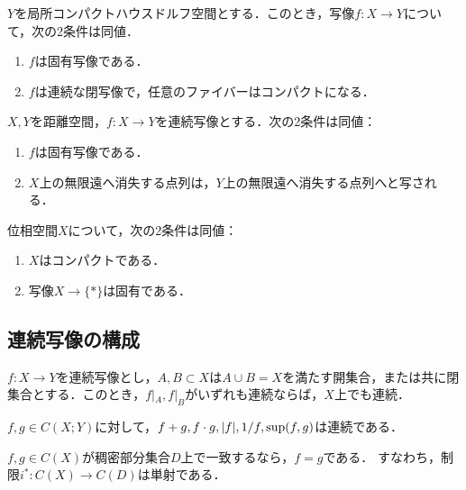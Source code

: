 \documentclass[uplatex,dvipdfmx]{jsreport}
\begin{document}
\begin{proposition}
    $Y$を局所コンパクトハウスドルフ空間とする．このとき，写像$f:X\to Y$について，次の2条件は同値．
    \begin{enumerate}
        \item $f$は固有写像である．
        \item $f$は連続な閉写像で，任意のファイバーはコンパクトになる．
    \end{enumerate}
\end{proposition}

\begin{proposition}
    $X,Y$を距離空間，$f:X\to Y$を連続写像とする．次の2条件は同値：
    \begin{enumerate}
        \item $f$は固有写像である．
        \item $X$上の無限遠へ消失する点列は，$Y$上の無限遠へ消失する点列へと写される．
    \end{enumerate}
\end{proposition}

\begin{proposition}
    位相空間$X$について，次の2条件は同値：
    \begin{enumerate}
        \item $X$はコンパクトである．
        \item 写像$X\to\{*\}$は固有である．
    \end{enumerate}
\end{proposition}

\subsection{連続写像の構成}

\begin{proposition}
    $f:X\to Y$を連続写像とし，$A,B\subset X$は$A\cup B=X$を満たす開集合，または共に閉集合とする．このとき，$f|_A,f|_B$がいずれも連続ならば，$X$上でも連続．
\end{proposition}

\begin{proposition}
    $f,g\in C(X;Y)$に対して，$f+g,f\cdot g,\lvert f\rvert,1/f,\sup(f,g)$は連続である．
\end{proposition}

\begin{proposition}
    $f,g\in C(X)$が稠密部分集合$D$上で一致するなら，$f=g$である．
    すなわち，制限$i^*:C(X)\to C(D)$は単射である．
\end{proposition}
\end{document}
